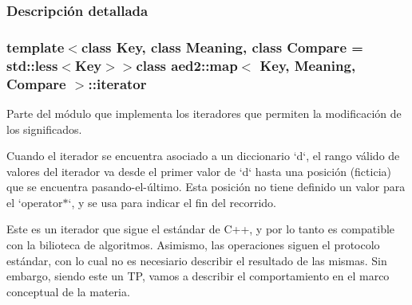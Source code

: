 \begin{Indent}
\subsubsection{\-Descripción detallada}
\subsubsection*{template$<$class \-Key, class \-Meaning, class \-Compare = std\-::less$<$\-Key$>$$>$class aed2\-::map$<$ Key, Meaning, Compare $>$\-::iterator}

\-Parte del módulo que implementa los iteradores que permiten la modificación de los significados. 

\-Cuando el iterador se encuentra asociado a un diccionario `d`, el rango válido de valores del iterador va desde el primer valor de `d` hasta una posición (ficticia) que se encuentra pasando-\/el-\/último. \-Esta posición no tiene definido un valor para el `operator$\ast$`, y se usa para indicar el fin del recorrido.

\-Este es un iterador que sigue el estándar de \-C++, y por lo tanto es compatible con la bilioteca de algoritmos. \-Asimismo, las operaciones siguen el protocolo estándar, con lo cual no es necesiario describir el resultado de las mismas. \-Sin embargo, siendo este un \-T\-P, vamos a describir el comportamiento en el marco conceptual de la materia.


\end{Indent}
